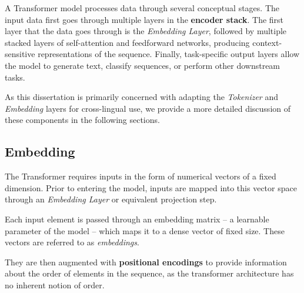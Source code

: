A Transformer model processes data through several conceptual stages. The input data first goes through multiple layers in the \textbf{encoder stack}. The first layer that the data goes through is the \emph{Embedding Layer}, followed by multiple stacked layers of self-attention and feedforward networks, producing context-sensitive representations of the sequence. Finally, task-specific output layers allow the model to generate text, classify sequences, or perform other downstream tasks. 

As this dissertation is primarily concerned with adapting the \emph{Tokenizer} and \emph{Embedding} layers for cross-lingual use, we provide a more detailed discussion of these components in the following sections.



\subsection{Embedding}\label{Section2.2.4}
The Transformer requires inputs in the form of numerical vectors of a fixed dimension. Prior to entering the model, inputs are mapped into this vector space through an \emph{Embedding Layer} or equivalent projection step.

Each input element is passed through an embedding matrix -- a learnable parameter of the model -- which maps it to a dense vector of fixed size. These vectors are referred to as \textit{embeddings}.



They are then augmented with \textbf{positional encodings} to provide information about the order of elements in the sequence, as the transformer architecture has no inherent notion of order.


